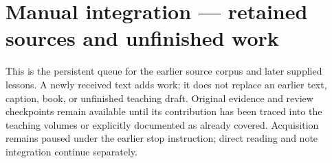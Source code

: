 \hypertarget{appendix-ac1f51db5e9a}{}
\section{Manual integration --- retained sources and unfinished work}\label{appendix-ac1f51db5e9a-manual-integration-retained-sources-and-unfinished-work}

This is the persistent queue for the earlier source corpus and later supplied lessons. A newly received text adds work; it does not replace an earlier text, caption, book, or unfinished teaching draft. Original evidence and review checkpoints remain available until its contribution has been traced into the teaching volumes or explicitly documented as already covered. Acquisition remains paused under the earlier stop instruction; direct reading and note integration continue separately.

